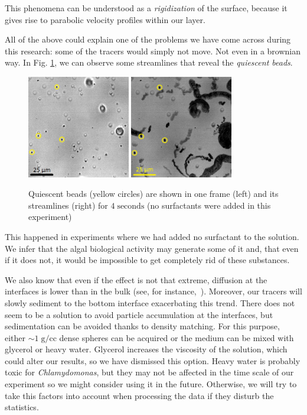 This phenomena can be understood as a \textit{rigidization} of the surface, because it gives rise to parabolic velocity profiles within our layer.

All of the above could explain one of the problems we have come across during this research: some of the tracers would simply not move. Not even in a brownian way. In Fig. \ref{quiescent_beads}, we can observe some streamlines that reveal the \textit{quiescent beads}.  

\begin{figure}[H]
	\centering
	\includegraphics[width=0.4\textwidth]{archivos/190726_H2O_0_18p5um_0001.png}
	\includegraphics[width=0.4\textwidth]{archivos/190726_H2O_0_18p5um_MIN200.png}
	\caption{Quiescent beads (yellow circles) are shown in one frame (left) and its streamlines (right) for $4 \; \textrm{seconds}$ (no surfactants were added in this experiment)}
	\label{quiescent_beads}
\end{figure}

This happened in experiments where we had added no surfactant to the solution. We infer that the algal biological activity may generate some of it and, that even if it does not, it would be impossible to get completely rid of these substances.

We also know that even if the effect is not that extreme, diffusion at the interfaces is lower than in the bulk (see, for instance,~\cite{peng2009}). Moreover, our tracers will slowly sediment to the bottom interface exacerbating this trend. There does not seem to be a solution to avoid particle accumulation at the interfaces, but sedimentation can be avoided thanks to density matching. For this purpose, either  $\sim 1 \; \textrm{g/cc}$ dense spheres can be acquired or the medium can be mixed with glycerol or heavy water. Glycerol increases the viscosity of the solution, which could alter our results, so we have dismissed this option. Heavy water is probably toxic for \textit{Chlamydomonas}, but they may not be affected in the time scale of our experiment so we might consider using it in the future. Otherwise, we will try to take this factors into account when processing the data if they disturb the statistics.

